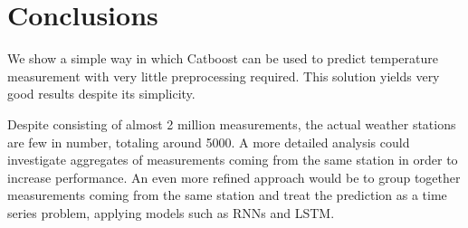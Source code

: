 \documentclass{article}
\begin{document}
\section{Conclusions}
We show a simple way in which Catboost can be used to predict temperature measurement with very little preprocessing required. This solution yields very good results despite its simplicity.

Despite consisting of almost 2 million measurements, the actual weather stations are few in number, totaling around 5000. A more detailed analysis could investigate aggregates of measurements coming from the same station in order to increase performance. An even more refined approach would be to group together measurements coming from the same station and treat the prediction as a time series problem, applying models such as RNNs and LSTM.
\end{document}
